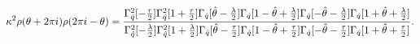 \begin{equation*}
\kappa ^{2}\rho (\theta +2\pi i)\rho (2\pi i-\theta )=\frac{\Gamma _{\hat{q}%
}^{2}[-\frac{\tau }{2}]\Gamma _{\hat{q}}^{2}[1+\frac{\tau }{2}]\Gamma _{\hat{%
q}}[\hat{\theta}-\frac{\lambda }{2}]\Gamma _{\hat{q}}[1-\hat{\theta}+\frac{%
\lambda }{2}]\Gamma _{\hat{q}}[-\hat{\theta}-\frac{\lambda }{2}]\Gamma _{%
\hat{q}}[1+\hat{\theta}+\frac{\lambda }{2}]}{\Gamma _{\hat{q}}^{2}[-\frac{%
\lambda }{2}]\Gamma _{\hat{q}}^{2}[1+\frac{\lambda }{2}]\Gamma _{\hat{q}}[%
\hat{\theta}-\frac{\tau }{2}]\Gamma _{\hat{q}}[1-\hat{\theta}+\frac{\tau }{2}%
]\Gamma _{\hat{q}}[-\hat{\theta}-\frac{\tau }{2}]\Gamma _{\hat{q}}[1+\hat{%
\theta}+\frac{\tau }{2}]}.
\end{equation*}%
